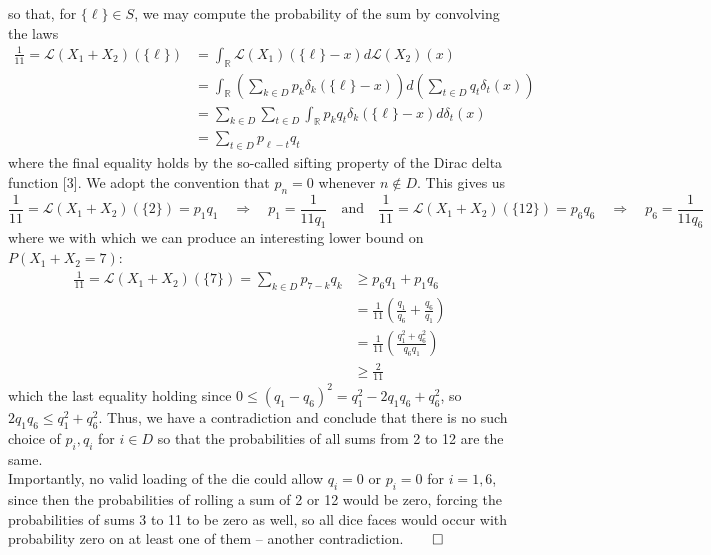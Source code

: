 \documentclass[10pt]{article}
\newcommand{\bp}[1]{\left({#1}\right)}
\newcommand{\mbb}[1]{\mathbb{#1}}
\newcommand{\1}[1]{\mathbbm{1}_{#1}}
\newcommand{\mc}[1]{\mathcal{#1}}
\begin{document}
    so that, for $\{\ell\}\in S$, we may compute the probability of the sum by convolving the laws
    \begin{align*}
        \frac{1}{11}=\mc{L}(X_1+X_2)(\{\ell\})&=\int_\mbb{R}\mc{L}(X_1)(\{\ell\}-x)d\mc{L}(X_2)(x)\\
        &=\int_\mbb{R}\bp{\sum_{k\in D}p_k\delta_k(\{\ell\}-x)}d\bp{\sum_{t\in D}q_t\delta_t(x)}\\
        &=\sum_{k\in D}\sum_{t\in D}\int_\mbb{R}p_kq_t\delta_k(\{\ell\}-x)d\delta_t(x)\\
        &=\sum_{t\in D}p_{\ell-t}q_t
    \end{align*}
    where the final equality holds by the so-called sifting property of the Dirac delta function [3]. We adopt the convention that $p_n=0$ whenever $n\notin D$. This gives us
    \[\frac{1}{11}=\mc{L}(X_1+X_2)(\{2\})=p_1q_1\quad\Rightarrow\quad p_1=\frac{1}{11q_1}\quad\text{and}\quad\frac{1}{11}=\mc{L}(X_1+X_2)(\{12\})=p_6q_6\quad\Rightarrow\quad p_6=\frac{1}{11q_6}\]
    where we with which we can produce an interesting lower bound on $P(X_1+X_2=7)$:
    \begin{align*}
        \frac{1}{11}=\mc{L}(X_1+X_2)(\{7\})=\sum_{k\in D}p_{7-k}q_k
        &\geq p_6q_1+p_1q_6\\
        &=\frac{1}{11}\bp{\frac{q_1}{q_6}+\frac{q_6}{q_1}}\\
        &=\frac{1}{11}\bp{\frac{q_1^2+q_6^2}{q_6q_1}}\\
        &\geq \frac{2}{11}
    \end{align*}
    which the last equality holding since $0\leq (q_1-q_6)^2=q_1^2-2q_1q_6+q_6^2$, so $2q_1q_6\leq q_1^2+q_6^2$. Thus, we have a contradiction and conclude that there is no such choice of $p_i,q_i$ for $i\in D$ so that the probabilities of all sums from 2 to 12 are the same.\\[5pt]
    Importantly, no valid loading of the die could allow $q_i=0$ or $p_i=0$ for $i=1,6$, since then
    the probabilities of rolling a sum of 2 or 12 would be zero, forcing the probabilities of sums 3 to 11 to be zero as well, so all dice faces would occur with probability zero on at least one of them -- another contradiction.\hfill{$\qed$}\\[5pt]
\end{document}
